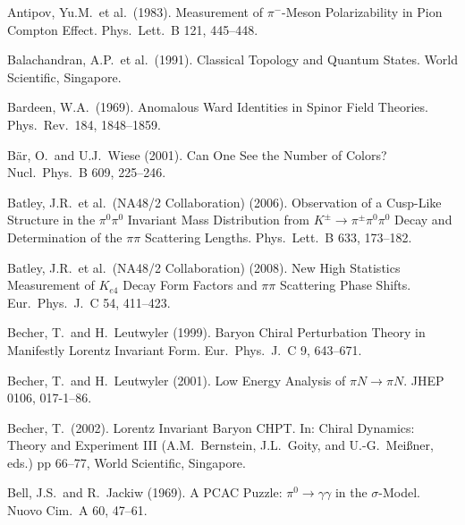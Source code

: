 \documentclass[twoside,12pt]{article}
\begin{document}
\begin{thebibliography}{}
Antipov, Yu.M.~et al.~(1983).
Measurement of $\pi^-$-Meson Polarizability in Pion Compton Effect.
Phys.\ Lett.\  B 121, 445--448.

Balachandran, A.P.~et al.~(1991).
Classical Topology and Quantum States.
World Scientific, Singapore.

Bardeen, W.A.~(1969).
Anomalous Ward Identities in Spinor Field Theories.
Phys.\ Rev.\  184, 1848--1859.

B\"ar, O.~and U.J.~Wiese (2001).
Can One See the Number of Colors?
Nucl.\ Phys.\  B 609, 225--246.

Batley, J.R.~et al.~(NA48/2 Collaboration) (2006).
Observation of a Cusp-Like Structure in the $\pi^0 \pi^0$ Invariant Mass
Distribution from $K^\pm \to \pi^\pm \pi^0 \pi^0$ Decay and Determination of
the $\pi \pi$ Scattering Lengths.
Phys.\ Lett.\  B 633, 173--182.

Batley, J.R.~et al.~(NA48/2 Collaboration) (2008).
New High Statistics Measurement of $K_{e4}$ Decay Form Factors and $\pi\pi$ Scattering Phase Shifts.
Eur.\ Phys.\ J.\  C 54, 411--423.

Becher, T.~and H.~Leutwyler (1999).
Baryon Chiral Perturbation Theory in Manifestly Lorentz Invariant Form.
Eur.\ Phys.\ J.\  C 9, 643--671.

Becher, T.~and H.~Leutwyler (2001).
Low Energy Analysis of $\pi N \to \pi N$.
JHEP 0106, 017-1--86.

Becher, T.~(2002). Lorentz Invariant Baryon CHPT.
In: Chiral Dynamics: Theory and Experiment III
(A.M.~Bernstein, J.L.~Goity, and U.-G.~Mei{\ss}ner, eds.)
pp 66--77, World Scientific, Singapore.

Bell, J.S.~and R.~Jackiw (1969).
A PCAC Puzzle: $\pi^0\to\gamma\gamma$ in the $\sigma$-Model.
Nuovo Cim.\  A 60, 47--61.


\end{thebibliography}
\end{document}
